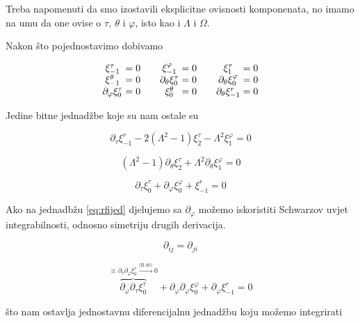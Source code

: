 \noindent Treba napomenuti da smo izostavili eksplicitne ovisnosti komponenata, no imamo na umu da one ovise o $\tau,\ \theta$ i $\varphi$, isto kao i $\Lambda$ i $\Omega$.

\noindent Nakon što pojednostavimo dobivamo

\begin{equation}
\begin{array}{c @{{}={}} c @{\qquad} c @{{}={}} c @{\qquad} c @{{}={}} c}
\xi^\tau_{-1} & 0 & \xi^\varphi_{-1} & 0 & \xi^\tau_1 & 0\\
\xi^\theta_{-1} & 0 & \partial_\theta\xi^\tau_{0} & 0 & \partial_\theta\xi^\varphi_0 & 0\\
\partial_\varphi\xi^\tau_0 & 0 & \xi^\theta_0 & 0 & \partial_\theta\xi^r_{-1} & 0\\
\end{array}
\end{equation}

\noindent Jedine bitne jednadžbe koje su nam ostale su 

\begin{equation}
\partial_\tau\xi^r_{-1}-2(\Lambda^2-1)\xi^\tau_{2}-\Lambda^2\xi^\varphi_{1}=0
\end{equation}

\begin{equation}
(\Lambda^2-1)\partial_\theta\xi^\tau_{2}+\Lambda^2\partial_\theta\xi^\varphi_1=0
\end{equation}

\begin{equation}
\partial_\tau\xi^\tau_0+\partial_\varphi\xi^\varphi_0+\xi^r_{-1}=0
\label{eq:rfijed}
\end{equation}

\noindent Ako na jednadbžu \eqref{eq:rfijed} djelujemo sa $\partial_\varphi$ možemo iskoristiti Schwarzov uvjet integrabilnosti, odnosno simetriju drugih derivacija.

\begin{equation*}
\partial_{ij}=\partial_{ji}
\end{equation*}

\begin{equation*}
\overbrace{\partial_\varphi\partial_\tau\xi^\tau_0}^{\equiv\partial_\tau\partial_\varphi\xi^\tau_0\xrightarrow{\text{(B.40)}}0}+\partial_\varphi\partial_\varphi\xi^\varphi_0+\partial_\varphi\xi^r_{-1}=0
\end{equation*}

\noindent što nam ostavlja jednostavnu diferencijalnu jednadžbu koju možemo integrirati 

